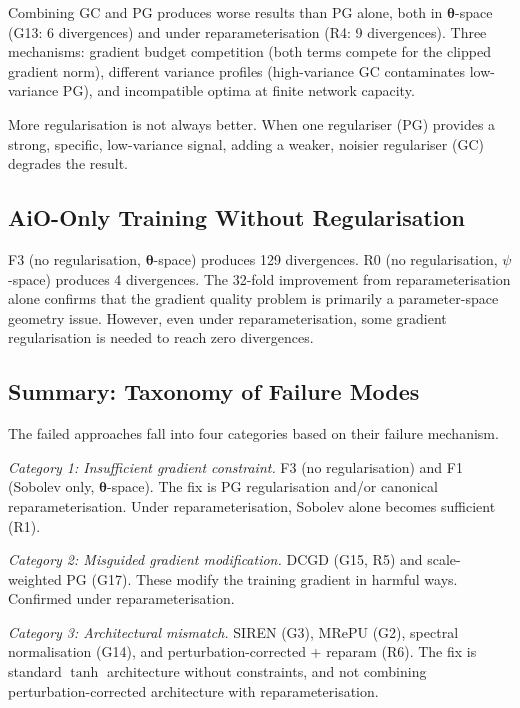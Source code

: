 \documentclass[11pt,a4paper]{article}
\theoremstyle{definition}
\newcommand{\btheta}{\boldsymbol{\theta}}
\begin{document}
	Combining GC and PG produces worse results than PG alone, both in $\btheta$-space (G13: 6 divergences) and under reparameterisation (R4: 9 divergences).
	Three mechanisms: gradient budget competition (both terms compete for the clipped gradient norm), different variance profiles (high-variance GC contaminates low-variance PG), and incompatible optima at finite network capacity.
	
	More regularisation is not always better.
	When one regulariser (PG) provides a strong, specific, low-variance signal, adding a weaker, noisier regulariser (GC) degrades the result.
	
	\subsection{AiO-Only Training Without Regularisation}
	\label{sec:no_reg}
	
	F3 (no regularisation, $\btheta$-space) produces 129 divergences.
	R0 (no regularisation, $\psi$-space) produces 4 divergences.
	The 32-fold improvement from reparameterisation alone confirms that the gradient quality problem is primarily a parameter-space geometry issue.
	However, even under reparameterisation, some gradient regularisation is needed to reach zero divergences.
	
	\subsection{Summary: Taxonomy of Failure Modes}
	\label{sec:failure_taxonomy}
	
	The failed approaches fall into four categories based on their failure mechanism.
	
	\emph{Category 1: Insufficient gradient constraint.}
	F3 (no regularisation) and F1 (Sobolev only, $\btheta$-space).
	The fix is PG regularisation and/or canonical reparameterisation.
	Under reparameterisation, Sobolev alone becomes sufficient (R1).
	
	\emph{Category 2: Misguided gradient modification.}
	DCGD (G15, R5) and scale-weighted PG (G17).
	These modify the training gradient in harmful ways.
	Confirmed under reparameterisation.
	
	\emph{Category 3: Architectural mismatch.}
	SIREN (G3), MRePU (G2), spectral normalisation (G14), and perturbation-corrected + reparam (R6).
	The fix is standard $\tanh$ architecture without constraints, and not combining perturbation-corrected architecture with reparameterisation.
	
\end{document}
